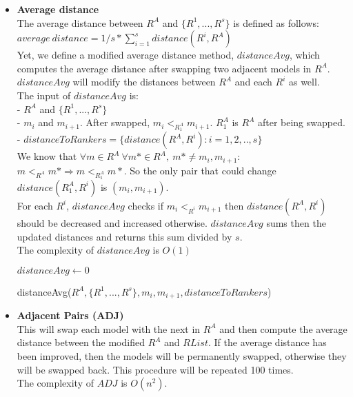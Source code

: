 \documentclass{article}
\begin{document}
\begin{itemize}
	  \item \textbf{Average distance}\\
	  	The average distance between $R^A$ and $\{R^1,...,R^s\}$ is defined as follows:\\
	  	$average~ distance = 1/s * \sum_{i = 1}^{s} distance(R^i, R^A)$\\
	  	Yet, we define a modified average distance method, $distanceAvg$, which computes the average distance after swapping two adjacent models in $R^A$. $distanceAvg$ will modify the distances between $R^A$ and each $R^i$ as well.\\
	  	The input of $distanceAvg$ is:\\
	  	- $R^A$ and $\{R^1,...,R^s\}$\\
	  	- $m_i$ and $m_{i+1}$. After swapped, $m_i <_{R_1^A} m_{i+1}$. $R^A_1$ is $R^A$ after being swapped.\\
	  	- $distanceToRankers = \{distance(R^A, R^i): i = 1, 2, .., s\}$\\
	  	We know that $\forall m \in R^A~ \forall m* \in R^A,~ m* \neq m_i, m_{i+1}$: $m <_{R^A} m* \Rightarrow m <_{R^A_1} m*$. So the only pair that could change $distance(R_1^A, R^i)$ is $(m_i, m_{i+1})$.\\
	  	For each $R^i$, $distanceAvg$ checks if $m_i <_{R^i} m_{i+1}$ then $distance(R^A, R^i)$ should be decreased and increased otherwise. $distanceAvg$ sums then the updated distances and returns this sum divided by $s$.\\
	  	The complexity of $distanceAvg$ is $O(1)$
	  	
	  	\begin{algorithm}
	  	$distanceAvg \leftarrow 0$\\
	  	\caption{distanceAvg($R^A, \{R^1,...,R^s\}, m_i, m_{i+1}, distanceToRankers$)}
	  	\end{algorithm}
	  	
	  \item \textbf{Adjacent Pairs (ADJ)}\\
	   This will swap each model with the next in $R^A$ and then compute the average distance between the modified $R^A$ and $RList$. If the average distance has been improved, then the models will be permanently swapped, otherwise they will be swapped back. This procedure will be repeated 100 times.\\
	   The complexity of $ADJ$ is $O(n^2)$.\\
	  

\end{itemize}
\end{document}
